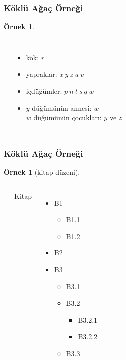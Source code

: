 \documentclass[dvipsnames]{beamer}
\theoremstyle{definition}
\theoremstyle{example}
\newtheorem{ornek}[theorem]{Örnek}
\theoremstyle{plain}
\begin{document}
\begin{frame}
  \frametitle{Köklü Ağaç Örneği}

  \begin{ornek}
    \begin{columns}
      \begin{center}
      \end{center}

      \pause
      \begin{itemize}
        \item kök: $r$
        \item yapraklar: $x ~ y ~ z ~ u ~ v$
        \item içdüğümler: $p ~ n ~ t ~ s ~ q ~ w$
        \item $y$ düğümünün annesi: $w$\\
          $w$ düğümünün çocukları: $y$ ve $z$\\
      \end{itemize}
    \end{columns}
  \end{ornek}
\end{frame}

\begin{frame}
  \frametitle{Köklü Ağaç Örneği}

  \begin{ornek}[kitap düzeni]
    \begin{columns}
      \begin{center}
      \end{center}

      \pause
      Kitap
      \begin{itemize}
        \item B1
        \begin{itemize}
          \item B1.1
          \item B1.2
        \end{itemize}
        \item B2
        \item B3
        \begin{itemize}
          \item B3.1
          \item B3.2
          \begin{itemize}
            \item B3.2.1
            \item B3.2.2
          \end{itemize}
          \item B3.3
        \end{itemize}
      \end{itemize}
    \end{columns}
  \end{ornek}
\end{frame}
\end{document}
